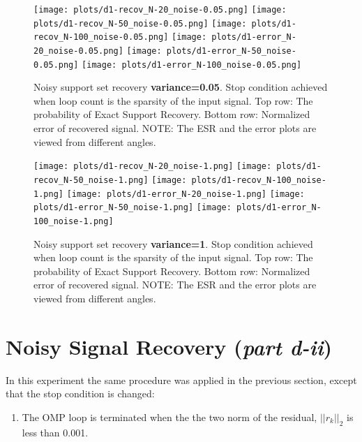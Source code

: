\documentclass{article}
\begin{document}
\begin{figure}[H]
    \captionsetup{width=.75\linewidth}
    \centering
        \texttt{[image: plots/d1-recov\_N-20\_noise-0.05.png]}
        \texttt{[image: plots/d1-recov\_N-50\_noise-0.05.png]}
        \texttt{[image: plots/d1-recov\_N-100\_noise-0.05.png]}
        \newline
        \texttt{[image: plots/d1-error\_N-20\_noise-0.05.png]}
        \texttt{[image: plots/d1-error\_N-50\_noise-0.05.png]}
        \texttt{[image: plots/d1-error\_N-100\_noise-0.05.png]}
        \caption{Noisy support set recovery {\bf variance=0.05}. Stop condition achieved when loop count is the sparsity of the input signal. Top row: The probability of Exact Support Recovery. Bottom row: Normalized error of recovered signal. NOTE: The ESR and the error plots are viewed from different angles.}
\end{figure}


\begin{figure}[H]
    \captionsetup{width=.75\linewidth}
    \centering
        \texttt{[image: plots/d1-recov\_N-20\_noise-1.png]}
        \texttt{[image: plots/d1-recov\_N-50\_noise-1.png]}
        \texttt{[image: plots/d1-recov\_N-100\_noise-1.png]}
        \newline
        \texttt{[image: plots/d1-error\_N-20\_noise-1.png]}
        \texttt{[image: plots/d1-error\_N-50\_noise-1.png]}
        \texttt{[image: plots/d1-error\_N-100\_noise-1.png]}
        \caption{Noisy support set recovery {\bf variance=1}. Stop condition achieved when loop count is the sparsity of the input signal. Top row: The probability of Exact Support Recovery. Bottom row: Normalized error of recovered signal. NOTE: The ESR and the error plots are viewed from different angles.}
\end{figure}

















\newpage
\section{Noisy Signal Recovery ({\it part d-ii})}

In this experiment the same procedure was applied in the previous section, except that the stop condition is changed:
\begin{enumerate}
    \item The OMP loop is terminated when the the two norm of the residual, $||r_k||_2$ is less than 0.001.
\end{enumerate}
\end{document}
